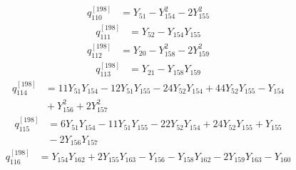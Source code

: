 \begin{equation}\label{q198:row:110}
\begin{aligned}
q_{110}^{[198]} &={} Y_{51} - Y_{154}^{2} - 2Y_{155}^{2}
\end{aligned}
\end{equation}
\begin{equation}\label{q198:row:111}
\begin{aligned}
q_{111}^{[198]} &={} Y_{52} - Y_{154}Y_{155}
\end{aligned}
\end{equation}
\begin{equation}\label{q198:row:112}
\begin{aligned}
q_{112}^{[198]} &={} Y_{20} - Y_{158}^{2} - 2Y_{159}^{2}
\end{aligned}
\end{equation}
\begin{equation}\label{q198:row:113}
\begin{aligned}
q_{113}^{[198]} &={} Y_{21} - Y_{158}Y_{159}
\end{aligned}
\end{equation}
\begin{equation}\label{q198:row:114}
\begin{aligned}
q_{114}^{[198]} &={} 11Y_{51}Y_{154} - 12Y_{51}Y_{155} - 24Y_{52}Y_{154} + 44Y_{52}Y_{155} - Y_{154}\\
&{} + Y_{156}^{2} + 2Y_{157}^{2}
\end{aligned}
\end{equation}
\begin{equation}\label{q198:row:115}
\begin{aligned}
q_{115}^{[198]} &={} 6Y_{51}Y_{154} - 11Y_{51}Y_{155} - 22Y_{52}Y_{154} + 24Y_{52}Y_{155} + Y_{155}\\
&{} - 2Y_{156}Y_{157}
\end{aligned}
\end{equation}
\begin{equation}\label{q198:row:116}
\begin{aligned}
q_{116}^{[198]} &={} Y_{154}Y_{162} + 2Y_{155}Y_{163} - Y_{156} - Y_{158}Y_{162} - 2Y_{159}Y_{163} - Y_{160}
\end{aligned}
\end{equation}
